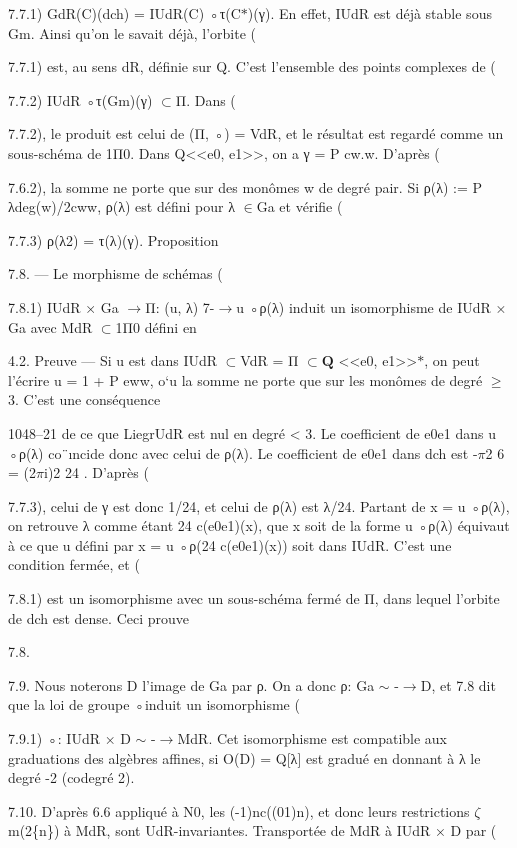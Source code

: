\documentclass[11pt]{article}
\begin{document}
7.7.1) GdR(C)(dch) = IUdR(C) ◦τ(C\(*\))(γ). En effet, IUdR est déjà stable sous Gm. Ainsi qu’on le savait déjà, l’orbite (

7.7.1) est, au sens dR, définie sur Q. C’est l’ensemble des points complexes de (

7.7.2) IUdR ◦τ(Gm)(γ) \(\subset\)Π. Dans (

7.7.2), le produit est celui de (Π, ◦) = VdR, et le résultat est regardé comme un sous-schéma de 1Π0. Dans Q<<e0, e1>>, on a γ = P cw.w. D’après (

7.6.2), la somme ne porte que sur des monômes w de degré pair. Si ρ(λ) := P λdeg(w)/2cww, ρ(λ) est défini pour λ \(\in\)Ga et vérifie (

7.7.3) ρ(λ2) = τ(λ)(γ). Proposition 

7.8. --- Le morphisme de schémas (

7.8.1) IUdR × Ga \(\to\)Π: (u, λ) 7-\(\to\)u ◦ρ(λ) induit un isomorphisme de IUdR × Ga avec MdR \(\subset\)1Π0 défini en 

4.2. Preuve --- Si u est dans IUdR \(\subset\)VdR = Π \(\subset\)\(\mathbf Q\) <<e0, e1>>\(*\), on peut l’écrire u = 1 + P eww, o`u la somme ne porte que sur les monômes de degré \(\ge\)3. C’est une conséquence

1048--21 de ce que LiegrUdR est nul en degré < 3. Le coefficient de e0e1 dans u ◦ρ(λ) co¨ıncide donc avec celui de ρ(λ). Le coefficient de e0e1 dans dch est -\(\pi\)2 6 = (2\(\pi\)i)2 24 . D’après (

7.7.3), celui de γ est donc 1/24, et celui de ρ(λ) est λ/24. Partant de x = u ◦ρ(λ), on retrouve λ comme étant 24 c(e0e1)(x), que x soit de la forme u ◦ρ(λ) équivaut à ce que u défini par x = u ◦ρ(24 c(e0e1)(x)) soit dans IUdR. C’est une condition fermée, et (

7.8.1) est un isomorphisme avec un sous-schéma fermé de Π, dans lequel l’orbite de dch est dense. Ceci prouve 

7.8. 

7.9. Nous noterons D l’image de Ga par ρ. On a donc ρ: Ga \(\sim\) -\(\to\)D, et 7.8 dit que la loi de groupe ◦induit un isomorphisme (

7.9.1) ◦: IUdR × D \(\sim\) -\(\to\)MdR. Cet isomorphisme est compatible aux graduations des algèbres affines, si O(D) = Q[λ] est gradué en donnant à λ le degré -2 (codegré 2). 

7.10. D’après 6.6 appliqué à N0, les (-1)nc((01)n), et donc leurs restrictions \(\zeta\)m(2\{n\}) à MdR, sont UdR-invariantes. Transportée de MdR à IUdR × D par (
\end{document}
